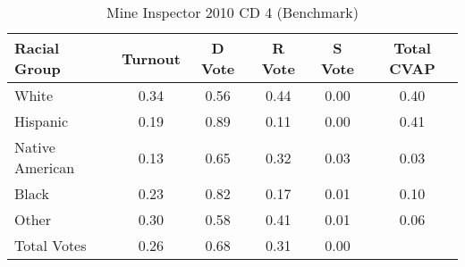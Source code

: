 \begin{table}[htb]
\begin{center}
\caption{Mine Inspector 2010 CD 4 (Benchmark)}
\label{smine_cvap_cd_4_benchmark}
\begin{tabular}{lccccc}
  \hline
Racial Group & Turnout & D Vote & R Vote & S Vote & Total CVAP \\ 
  \hline
White & 0.34 & 0.56 & 0.44 & 0.00 & 0.40 \\ 
  Hispanic & 0.19 & 0.89 & 0.11 & 0.00 & 0.41 \\ 
  Native American & 0.13 & 0.65 & 0.32 & 0.03 & 0.03 \\ 
  Black & 0.23 & 0.82 & 0.17 & 0.01 & 0.10 \\ 
  Other & 0.30 & 0.58 & 0.41 & 0.01 & 0.06 \\ 
  Total Votes & 0.26 & 0.68 & 0.31 & 0.00 &  \\ 
   \hline
\end{tabular}
\end{center}
\end{table}
